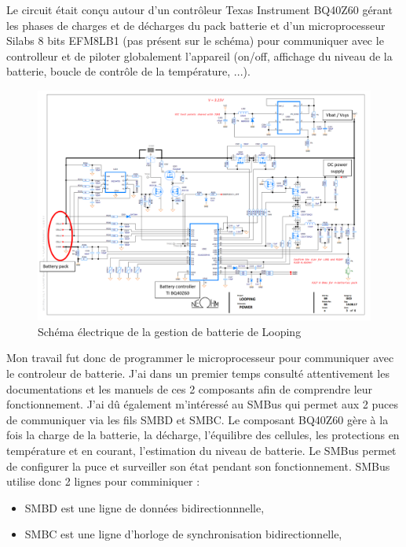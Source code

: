 \documentclass[a4paper, 11pt]{report}
\begin{document}
Le circuit était conçu autour d'un contrôleur Texas Instrument BQ40Z60 gérant les phases de charges et de décharges du pack batterie et d'un microprocesseur Silabs 8 bits EFM8LB1 (pas présent sur le schéma) pour communiquer avec le controlleur et de piloter globalement l'appareil (on/off, affichage du niveau de la batterie, boucle de contrôle de la température, ...).

\begin{figure}[!h]
\begin{center}
\includegraphics[scale=0.6]{figures/screenshots/battery_charger.png}
\end{center}
\caption{Schéma électrique de la gestion de batterie de Looping}
\label{fig:looping_charger}
\end{figure}

Mon travail fut donc de programmer le microprocesseur pour communiquer avec le controleur de batterie. J’ai dans un premier temps consulté attentivement les documentations et les manuels de ces 2 composants afin de comprendre leur fonctionnement. J’ai dû également m’intéressé au SMBus 
qui permet aux 2 puces de communiquer via les fils SMBD et SMBC.
Le composant BQ40Z60 gère à la fois la charge de la batterie, la décharge, l’équilibre des cellules, les protections en température et en courant, l’estimation du niveau de batterie. Le SMBus permet de configurer la puce et surveiller son état pendant son fonctionnement.
SMBus utilise donc 2 lignes pour comminiquer :
\begin{itemize} %
\item SMBD est une ligne de données bidirectionnnelle,
\item SMBC est une ligne d'horloge de synchronisation bidirectionnelle,
\end{itemize}
\end{document}
